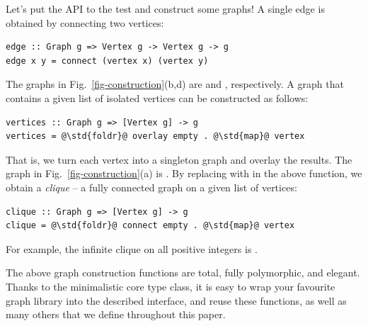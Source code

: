 Let's put the API to the test and construct some graphs! A single edge is
obtained by connecting two vertices:

\begin{verbatim}
edge :: Graph g => Vertex g -> Vertex g -> g
edge x y = connect (vertex x) (vertex y)
\end{verbatim}

\noindent
The graphs in Fig.~\ref{fig-construction}(b,d) are  and
, respectively.
A graph that contains a given list of isolated vertices can be constructed
as follows:

\begin{verbatim}
vertices :: Graph g => [Vertex g] -> g
vertices = @\std{foldr}@ overlay empty . @\std{map}@ vertex
\end{verbatim}

\noindent
That is, we turn each vertex into a singleton graph and overlay the results.
The graph in Fig.~\ref{fig-construction}(a) is .
By replacing  with  in the above
function, we obtain a \emph{clique} -- a fully connected graph on a given list
of vertices:

\begin{verbatim}
clique :: Graph g => [Vertex g] -> g
clique = @\std{foldr}@ connect empty . @\std{map}@ vertex
\end{verbatim}

\noindent
For example, the infinite clique on all positive integers is .

The above graph construction functions are total, fully polymorphic, and elegant.
Thanks to the minimalistic core type class, it is easy to wrap your favourite
graph library into the described interface, and reuse these functions, as well
as many others that we define throughout this paper.
